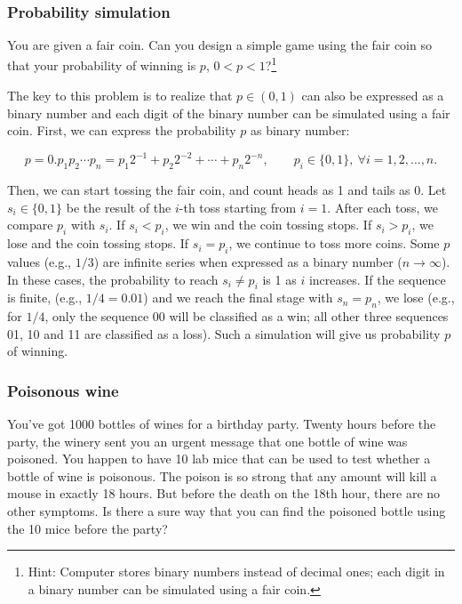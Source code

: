 \subsubsection*{Probability simulation}

\begin{problem}{You are given a fair coin. Can you design a simple game using the fair coin so that your
probability of winning is $p$, $0<p<1$?\footnote[9]{Hint: Computer stores binary numbers
instead of decimal ones; each digit in a binary number can be simulated using a fair coin.}}
\end{problem}


\begin{solution}
The key to this problem is to realize that $p\in(0,1)$ can also be expressed as a binary
number and each digit of the binary number can be simulated using a fair coin. First, we
can express the probability $p$ as binary number:

\[
p=0.p_1p_2\cdots p_n=p_1 2^{-1}+p_2 2^{-2}+\cdots+p_n 2^{-n},
\qquad p_i\in\{0,1\},\ \forall i=1,2,\ldots,n.
\]

Then, we can start tossing the fair coin, and count heads as 1 and tails as 0. Let
$s_i\in\{0,1\}$ be the result of the $i$-th toss starting from $i=1$. After each toss, we
compare $p_i$ with $s_i$. If $s_i<p_i$, we win and the coin tossing stops. If $s_i>p_i$,
we lose and the coin tossing stops. If $s_i=p_i$, we continue to toss more coins. Some
$p$ values (e.g., $1/3$) are infinite series when expressed as a binary number
($n\to\infty$). In these cases, the probability to reach $s_i\neq p_i$ is 1 as $i$ increases.
If the sequence is finite, (e.g., $1/4=0.01$) and we reach the final stage with $s_n=p_n$,
we lose (e.g., for $1/4$, only the sequence 00 will be classified as a win; all other three
sequences 01, 10 and 11 are classified as a loss). Such a simulation will give us
probability $p$ of winning.\qedhere

\end{solution}

\subsubsection*{Poisonous wine}

\begin{problem}{You've got 1000 bottles of wines for a birthday party. Twenty hours before the party,
the winery sent you an urgent message that one bottle of wine was poisoned. You happen
to have 10 lab mice that can be used to test whether a bottle of wine is poisonous. The
poison is so strong that any amount will kill a mouse in exactly 18 hours. But before the
death on the 18th hour, there are no other symptoms. Is there a sure way that you can find
the poisoned bottle using the 10 mice before the party?}
\end{problem}

